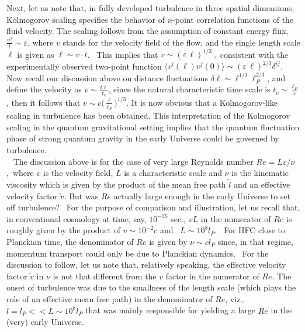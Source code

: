 \documentclass[12pt]{article}
\begin{document}
Next, let us note that, in fully developed turbulence in three spatial dimensions, Kolmogorov 
scaling specifies the
behavior of $n$-point correlation functions of the fluid velocity.
The scaling \cite{k41} follows from the assumption of constant energy flux,
$\frac{v^2}{t} \sim \varepsilon$, where $v$ stands for the velocity field of the
flow, and the single length scale $\ell$ is given as
$\ell \sim v\cdot t$.  This implies that $ v \sim (\varepsilon\, \ell)^{1/3}~, $
consistent with the experimentally observed two-point function
$\langle v^i(\ell) v^j(0)\rangle \sim (\varepsilon\, \ell)^{2/3} \delta^{ij}$.
Now recall our discussion above on
distance fluctuations $\delta \ell \sim \ell^{1/3} \ell_P^{2/3}$,
and define the velocity as
$v \sim \frac{\delta \ell}{t_c} $,
since the natural characteristic time scale is $t_c \sim \frac{\ell_P}{c} $,
then it follows that
$v \sim c \big(\frac{\ell}{\ell_P}\big)^{1/3} $. It is now obvious that a
Kolmogorov-like scaling \cite{k41} in turbulence has been obtained.
This interpretation of the Kolmogorov scaling in the quantum
gravitational setting implies that the quantum
fluctuation phase of strong quantum gravity in the early Universe 
could be governed by turbulence. \\

 
The discussion above is for the case of very large Reynolds number 
$Re = Lv/\nu$, where $v$ is the velocity field, $L$ is a characteristic scale 
and $\nu$ is the kinematic viscosity which is given by the product of the mean free path 
$\tilde{l}$ and an effective velocity factor $\tilde{v}$.
But was $Re$ actually large enough in the early Universe to set off turbulence?  For the
purpose of comparison and illustration, let us recall that, in conventional
cosmology at time, say, $10^{-35}$ sec., 
$vL$ in the numerator of $Re$ is roughly given
by the product of $v \sim 10^{-2} c$ and  $L \sim 10^{8} l_P$. \cite{Gibson}
For HFC close to
Planckian time, the denominator of $Re$ is given by $\nu \sim c l_P$ since, in that
regime, momentum transport could only be due to Planckian dynamics.  For the
discussion to follow, let us note that, relatively speaking, the 
effective velocity factor $\tilde{v}$ in
$\nu$ is not that different from the $v$ factor in the numerator of $Re$. The onset
of turbulence was due to
the smallness of the length scale (which plays the role of an effective 
mean free path) in the denominator of $Re$, viz., 
$\tilde{l} = l_P << L \sim 10^{8} l_P$ that was mainly responsible for
yielding a large $Re$ in the (very) early Universe. \\
\end{document}
